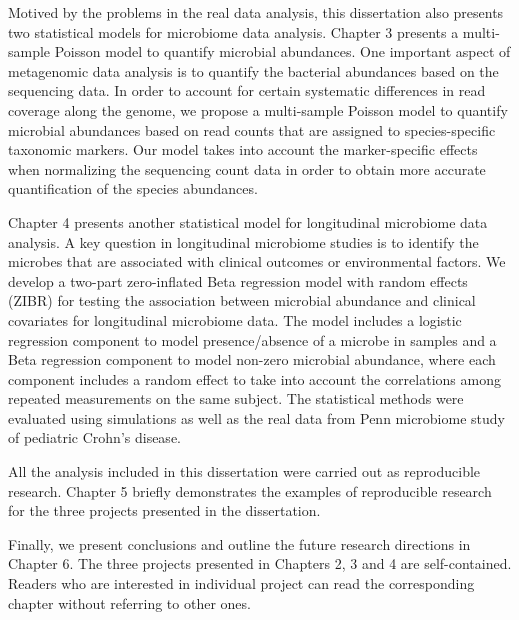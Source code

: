 Motived by the problems in the real data analysis, this dissertation also presents two statistical models for microbiome data analysis. Chapter 3 presents a multi-sample Poisson model to quantify microbial abundances. One important aspect of metagenomic data analysis is to quantify the bacterial abundances based on the sequencing data. In order to account for certain systematic differences in read coverage along the genome, we propose a multi-sample Poisson model to quantify microbial abundances based on read counts that are assigned to species-specific taxonomic markers. Our model takes into account the marker-specific effects when normalizing the sequencing count data in order to obtain more accurate quantification of the species abundances. 

Chapter 4 presents another statistical model  for longitudinal microbiome data analysis. A key question in longitudinal microbiome studies is to identify the microbes that are associated with clinical outcomes or environmental factors. We develop a two-part zero-inflated Beta regression model with random effects (ZIBR) for testing the association between microbial abundance and clinical covariates for longitudinal microbiome data. The model includes a logistic regression component to model presence/absence of a microbe in samples and a Beta regression component to model non-zero microbial abundance, where each component includes a random effect to take into account the correlations among repeated measurements on the same subject. The statistical methods were evaluated using simulations as well as the real data from Penn microbiome study of pediatric Crohn's disease.

All the analysis included in this dissertation were carried out as reproducible research. Chapter 5 briefly demonstrates the examples of reproducible research for the three projects presented in the dissertation.

Finally, we present conclusions and outline the future research directions in Chapter 6. The three projects presented in Chapters 2, 3 and 4 are self-contained. Readers who are interested in individual project can read the corresponding chapter without referring to other ones.
